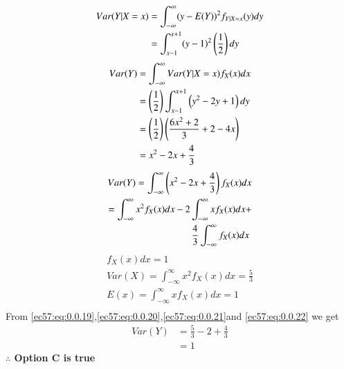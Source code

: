 \begin{align}
    Var(Y|X=x)&=\int_{-\infty}^{\infty}(y-E(Y))^2f_{Y|X=x}(y)dy\\
    &=\int_{x-1}^{x+1}(y-1)^2\left(\frac{1}{2}\right)dy
\end{align}
\begin{align}
    Var(Y)&=\int_{-\infty}^{\infty}Var(Y|X=x)f_{X}(x)dx\\
    &=\left(\frac{1}{2}\right)\int_{x-1}^{x+1}\left(y^2-2y+1\right)dy\\
    &=\left(\frac{1}{2}\right)\left(\frac{6x^2+2}{3}+2-4x\right)\\
    &=x^2-2x+\frac{4}{3}
\end{align}
\begin{align}
  Var(Y)=\int_{-\infty}^{\infty}\brak{x^2-2x+\frac{4}{3}}f_{X}(x)dx\\
   =\int_{-\infty}^{\infty}x^2f_{X}(x)dx-2\int_{-\infty}^{\infty}xf_{X}(x)dx+\\\label{ec57:eq:0.0.19}\frac{4}{3}\int_{-\infty}^{\infty}f_{X}(x)dx\
 \end{align}
\begin{align}
  f_{X}(x)dx=1\\\label{ec57:eq:0.0.20}
 Var(X)=\int_{-\infty}^{\infty}x^2f_{X}(x)dx=\frac{5}{3}\\\label{ec57:eq:0.0.21}
 E(x)=\int_{-\infty}^{\infty}xf_{X}(x)dx=1\\\label{ec57:eq:0.0.22}
 \end{align}
 From \eqref{ec57:eq:0.0.19},\eqref{ec57:eq:0.0.20},\eqref{ec57:eq:0.0.21}and \eqref{ec57:eq:0.0.22} we get
 \begin{align}
     Var(Y)&=\frac{5}{3}-2+\frac{4}{3}\\
     &=1
 \end{align}
\textbf{$\therefore$ Option C is true}